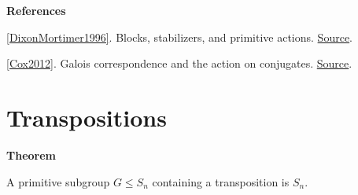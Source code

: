 \documentclass[11pt,a4paper,oneside,openany]{book}
\newenvironment{sources}{\par\smallskip\begingroup\footnotesize\color{atlasgray}\leftskip=10pt\setlength{\parskip}{2pt}}{\par\endgroup\smallskip}
\begin{document}
\begin{sources}
\textbf{References}\par\smallskip
\noindent\hyperlink{ref:DixonMortimer1996}{[DixonMortimer1996]}. Blocks, stabilizers, and primitive actions. \href{https://link.springer.com/book/10.1007/978-1-4612-0731-3}{Source}.\par
\noindent\hyperlink{ref:Cox2012}{[Cox2012]}. Galois correspondence and the action on conjugates. \href{https://onlinelibrary.wiley.com/doi/book/10.1002/9781118218457}{Source}.\par
\end{sources}\color{black}
\section{Transpositions}

\begin{atlasblock}[standard]
\textbf{\sffamily Theorem}\par\smallskip
\color{black} A primitive subgroup \(G\le S_n\) containing a transposition is \(S_n\).\par
\end{atlasblock}\color{black}
\end{document}
